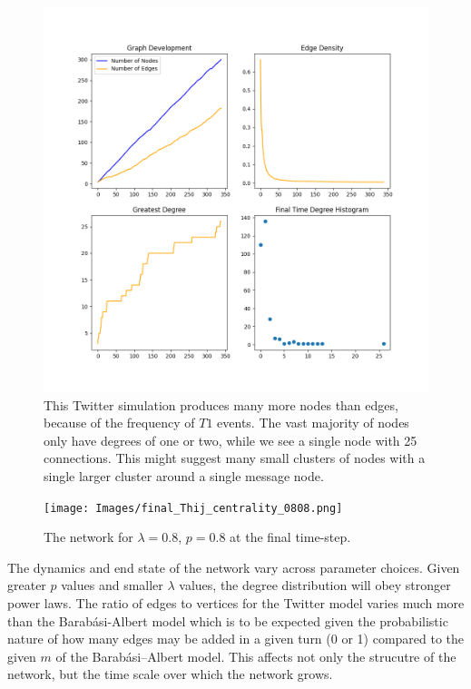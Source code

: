 \begin{figure}[h!]
    \includegraphics[width=14cm]{Images/twitter_sim_stats_3_0.8_0.8.png}
    \centering
    \caption{This Twitter simulation produces many more nodes than 
    edges, because of the frequency of $T1$ events. The vast majority of nodes only 
    have degrees of one or two, while we see a single node with 25 connections.
    This might suggest many small clusters of nodes with a single larger
    cluster around a single message node.}
\end{figure}


\begin{figure}[h!]
    \texttt{[image: Images/final\_Thij\_centrality\_0808.png]}
    \centering
    \caption{The network for $\lambda=0.8$, $p=0.8$ at the final time-step.}
\end{figure}

\clearpage

The dynamics and end state of the network vary across parameter choices.
Given greater $p$ values and smaller $\lambda$ values, the degree distribution will obey stronger
power laws. The ratio of edges to vertices for the Twitter model varies much more than the Barabási-Albert model
which is to be expected given the probabilistic nature of how many edges may be added in a given turn (0 or 1) compared
to the given $m$ of the Barabási–Albert model. This affects not only the strucutre of the network, but the time scale 
over which the network grows.

